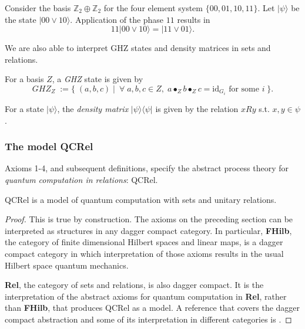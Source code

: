 \begin{example}
Consider the basis $\mathbb{Z}_2\oplus\mathbb{Z}_2$ for the four element system $\{00,01,10,11\}$.  Let $|\psi\rangle$ be the state $|00\vee10\rangle$. Application of the phase $11$ results in
\[ 11|00\vee10\rangle = |11\vee01\rangle . \]
\end{example}

We are also able to interpret GHZ states and density matrices in sets and relations.

\begin{defn}
For a basis $Z$, a \emph{GHZ} state is given by
\[ GHZ_Z \; := \{\;(a,b,c)\;|\;\ \forall \;a,b,c \in Z,\;a\bullet_Zb\bullet_Zc = \mbox{id}_{G_i}\mbox{ for some } i\;\}.  \]
\end{defn}

\begin{defn}
For a state $|\psi\rangle$, the \emph{density matrix} $|\psi\rangle\langle\psi|$ is given by the relation $xRy$ s.t. $x,y\in \psi$.
\end{defn}

\subsubsection*{The model QCRel}

\begin{defn}
Axioms 1-4, and subsequent definitions, specify the abstract process theory for \emph{quantum computation in relations}: QCRel.
\end{defn}

\begin{theorem}
QCRel is a model of quantum computation with sets and unitary relations.
\end{theorem}
\begin{proof}
This is true by construction.  The axioms on the preceding section can be interpreted as structures in any dagger compact category. In particular, {\bf FHilb}, the category of finite dimensional Hilbert spaces and linear maps,  is a dagger compact category in which interpretation of those axioms results in the usual Hilbert space quantum mechanics.

{\bf Rel}, the category of sets and relations, is also dagger compact.  It is the interpretation of the abstract axioms for quantum computation in {\bf Rel}, rather than {\bf FHilb}, that produces QCRel as a model. A reference that covers the dagger compact abstraction and some of its interpretation in different categories is \cite{cqm-notes}.
\end{proof}

